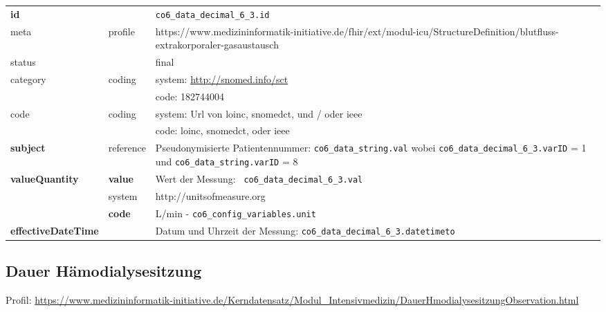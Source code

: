 \begin{longtable}{|l|l|p{7.5cm}|}
	\hline
	\rowcolor{lightgray} \multicolumn{3}{|l|}{Data Mapping (inhaltlich)} \\ \hline
	\textbf{id} &  & \texttt{co6\_data\_decimal\_6\_3.id} \\ \hline
	meta & profile & https://www.medizininformatik-initiative.de/fhir/ext/modul-icu/StructureDefinition/blutfluss-extrakorporaler-gasaustausch \\ \hline 
	status &  & final   \\ \hline 
	category & coding & system: \url{http://snomed.info/sct} \\
	\cline{3-3}
	& & code: 182744004 \\ \hline
	code & coding & system: Url von \ac{loinc}, \ac{snomedct}, und / oder \ac{ieee} \\ 
	\cline{3-3} 
	&  & code: \ac{loinc}, \ac{snomedct}, oder \ac{ieee} \\ \hline
	\textbf{subject} & reference & Pseudonymisierte Patientennummer: \texttt{co6\_data\_string.val} wobei \texttt{co6\_data\_decimal\_6\_3.varID} = 1 und \texttt{co6\_data\_string.varID} = 8 \\ \hline
	\textbf{valueQuantity}  & \textbf{value} & Wert der Messung: \texttt{
		co6\_data\_decimal\_6\_3.val} \\
	\cline{2-3}
	& system & http://unitsofmeasure.org \\
	\cline{2-3}
	& \textbf{code} & L/min - \texttt{co6\_config\_variables.unit}
	\\ \hline
	\textbf{effectiveDateTime}  & & Datum und Uhrzeit der Messung: \texttt{co6\_data\_decimal\_6\_3.datetimeto} \\
	\hline
\end{longtable}

\subsection{Dauer Hämodialysesitzung} 

Profil: \url{https://www.medizininformatik-initiative.de/Kerndatensatz/Modul_Intensivmedizin/DauerHmodialysesitzungObservation.html}

